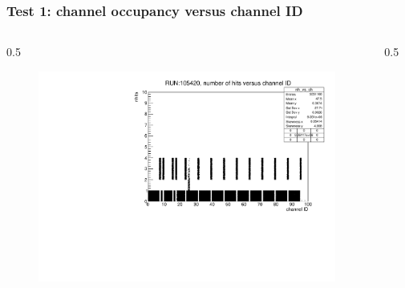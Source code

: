 \documentclass{beamer}
\begin{document}
\begin{frame}
\frametitle{Test 1: channel occupancy versus channel ID}
\vspace{-4mm}
\begin{columns}
\begin{column}{0.5\framewidth}
         \begin{figure}[!h]
      \centering
      \hspace*{-2em}
      \includegraphics[width=1.1\columnwidth]{figures/pdf/run105420_nh_vs_ch.pdf}
     \label{fig:normalhits}
\end{figure}
\end{column}
\begin{column}{0.5\framewidth}
      \begin{figure}[!h]
      \centering
            \hspace*{-1em}

\end{figure}
\end{column}
\end{columns}
\end{frame}
\end{document}
